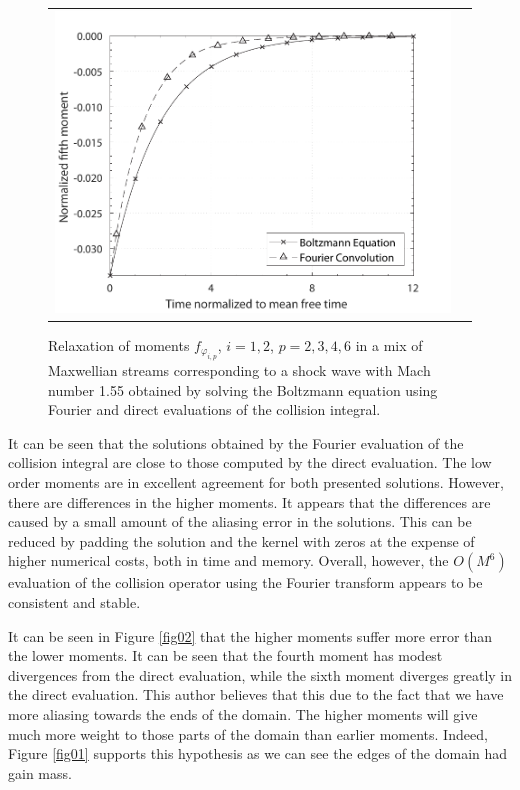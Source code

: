\documentclass[12pt]{CSUNthesis}
\begin{document}
\begin{center}
\begin{figure}[h]
\begin{tabular}{@{}cc@{}}
  \includegraphics[height=.218\textheight]{images/m155_15N_mom6.pdf}\\
  \end{tabular}
\caption{\label{fig03} Relaxation of moments $f_{\varphi_{i,p}}$, $i=1,2$, $p=2,3,4,6$ 
in a mix of Maxwellian streams corresponding to a shock wave with 
Mach number 1.55 obtained by solving the Boltzmann equation using Fourier and direct evaluations of the collision integral.}
\end{figure}
\end{center}

It can be seen that the solutions obtained by the Fourier evaluation of the collision 
integral are close to those computed by the direct evaluation. The low order moments 
are in excellent agreement for both presented solutions. However, there are 
differences in the higher moments. It appears that the differences are caused 
by a small amount of the aliasing error in the solutions. This can be reduced 
by padding the solution and the kernel with zeros at the expense of higher numerical 
costs, both in time and memory. Overall, however, the $O(M^6)$ evaluation of 
the collision operator using the Fourier transform appears to be consistent 
and stable. 

It can be seen in Figure \ref{fig02} that the higher moments suffer more error than the lower moments.
It can be seen that the fourth moment has modest divergences from the direct evaluation, while the sixth moment diverges greatly in the direct evaluation.
This author believes that this due to the fact that we have more aliasing towards the ends of the domain. 
The higher moments will give much more weight to those parts of the domain than earlier moments. 
Indeed, Figure \ref{fig01} supports this hypothesis as we can see the edges of the domain had gain mass.
\end{document}
